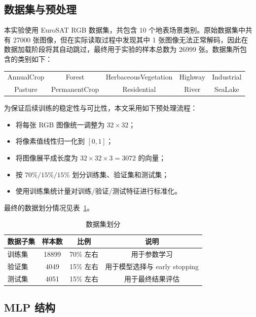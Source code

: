 \documentclass[UTF8,a4paper,11pt]{ctexart}
\begin{document}
\subsection{数据集与预处理}

本实验使用 EuroSAT RGB 数据集，共包含 10 个地表场景类别。原始数据集中共有 27000 张图像，但在实际读取过程中发现其中 1 张图像无法正常解码，因此在数据加载阶段将其自动跳过，最终用于实验的样本总数为 26999 张。数据集所包含的类别如下：

\begin{center}
\small
\begin{tabular}{ccccc}
AnnualCrop & Forest & HerbaceousVegetation & Highway & Industrial \\
Pasture & PermanentCrop & Residential & River & SeaLake
\end{tabular}
\end{center}

为保证后续训练的稳定性与可比性，本文采用如下预处理流程：

\begin{itemize}
    \item 将每张 RGB 图像统一调整为 $32 \times 32$；
    \item 将像素值线性归一化到 $[0, 1]$；
    \item 将图像展平成长度为 $32 \times 32 \times 3 = 3072$ 的向量；
    \item 按 $70\%/15\%/15\%$ 划分训练集、验证集和测试集；
    \item 使用训练集统计量对训练/验证/测试特征进行标准化。
\end{itemize}

最终的数据划分情况见表~\ref{tab:data-split}。

\begin{table}[H]
    \centering
    \caption{数据集划分}
    \label{tab:data-split}
    \begin{tabular}{lccc}
        \toprule
        数据子集 & 样本数 & 比例 & 说明 \\
        \midrule
        训练集 & 18899 & 70\% 左右 & 用于参数学习 \\
        验证集 & 4049 & 15\% 左右 & 用于模型选择与 early stopping \\
        测试集 & 4051 & 15\% 左右 & 用于最终结果评估 \\
        \bottomrule
    \end{tabular}
\end{table}

\subsection{MLP 结构}
\end{document}
